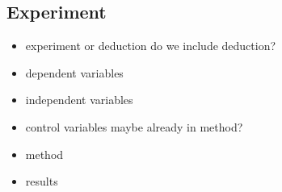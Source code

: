\subsection{Experiment}

\begin{itemize}
	\item experiment or deduction {\color{red} do we include deduction?}
	\item dependent variables
	\item independent variables
	\item control variables {\color{red} maybe already in method?}
	\item method
	\item results
\end{itemize}